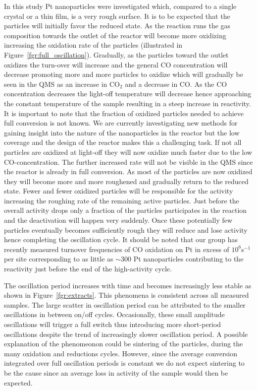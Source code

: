\documentclass[8.5pt,twoside,twocolumn]{article}
\begin{document}
In this study Pt nanoparticles were investigated which, compared to a single crystal or a thin film, is a very rough surface. It is to be expected that the particles will initially favor the reduced state. As the reaction runs the gas composition towards the outlet of the reactor will become more oxidizing increasing the oxidation rate of the particles (illustrated in Figure~\ref{fgr:full_oscillation}). Gradually, as the particles toward the outlet oxidizes the turn-over will increase and the general CO concentration will decrease promoting more and more particles to oxidize which will gradually be seen in the QMS as an increase in CO$_2$ and a decrease in CO. As the CO concentration decreases the light-off temperature will decrease hence approaching the constant temperature of the sample resulting in a steep increase in reactivity. It is important to note that the fraction of oxidized particles needed to achieve full conversion is not known. We are currently investigating new methods for gaining insight into the nature of the nanoparticles in the reactor but the low coverage and the design of the reactor makes this a challenging task. If not all particles are oxidized at light-off they will now oxidize much faster due to the low CO-concentration. The further increased rate will not be visible in the QMS since the reactor is already in full conversion. As most of the particles are now oxidized they will become more and more roughened and gradually return to the reduced state. Fewer and fewer oxidized particles will be responsible for the activity increasing the roughing rate of the remaining active particles. Just before the overall activity drops only a fraction of the particles participates in the reaction and the deactivation will happen very suddenly. Once these potentially few particles eventually becomes sufficiently rough they will reduce and lose activity hence completing the oscillation cycle. It should be noted that our group has recently measured turnover frequencies of CO oxidation on Pt in excess of $10^{6}$s$^{-1}$ per site corresponding to as little as $\sim$300 Pt nanoparticles contributing to the reactivity just before the end of the high-activity cycle.

The oscillation period increases with time and becomes increasingly less stable as shown in Figure~\ref{fgr:extracts}. This phenomena is consistent across all measured samples. The large scatter in oscillation period can be attributed to the smaller oscillations in between on/off cycles. Occasionally, these small amplitude oscillations will trigger a full switch thus introducing more short-period oscillations despite the trend of increasingly slower oscillation period. A possible explanation of the phenomeonon could be sintering of the particles, during the many oxidation and reductions cycles. However, since the average conversion integrated over full oscillation periods is constant we do not expect sintering to be the cause since an average loss in activity of the sample would then be expected.
\end{document}
